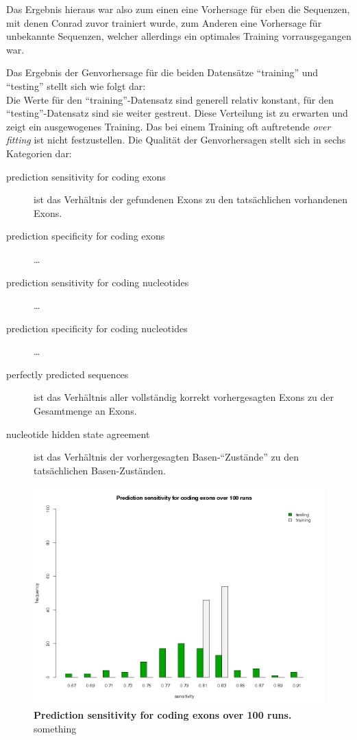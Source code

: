 Das Ergebnis hieraus war also zum einen eine Vorhersage für eben die Sequenzen,
mit denen Conrad zuvor trainiert wurde, zum Anderen eine Vorhersage für unbekannte
Sequenzen, welcher allerdings ein optimales Training vorrausgegangen war.

Das Ergebnis der Genvorhersage für die beiden Datensätze \enquote{training} und
\enquote{testing} stellt sich wie folgt dar:\\
Die Werte für den \enquote{training}-Datensatz sind generell relativ konstant,
für den \enquote{testing}-Datensatz sind sie weiter gestreut.
Diese Verteilung ist zu erwarten und zeigt ein ausgewogenes Training.
Das bei einem Training oft auftretende \textit{over fitting} ist nicht
festzustellen.
Die Qualität der Genvorhersagen stellt sich in sechs Kategorien dar:
\begin{description}
\item[prediction sensitivity for coding exons] ist das Verhältnis
der gefundenen Exons zu den tatsächlichen vorhandenen Exons.
\item[prediction specificity for coding exons] \ldots
\item[prediction sensitivity for coding nucleotides] \ldots
\item[prediction specificity for coding nucleotides] \ldots
\item[perfectly predicted sequences] ist das Verhältnis aller
vollständig korrekt vorhergesagten Exons zu der Gesamtmenge an Exons.
\item[nucleotide hidden state agreement] ist das Verhältnis der vorhergesagten
Basen-\enquote{Zustände} zu den tatsächlichen Basen-Zuständen.
\end{description}

\begin{figure}[ht]
	\begin{center}
		\includegraphics[scale=0.42]{pics/codingExons_sens.png}
	\caption[Prediction sensitivity for coding exons over 100 runs]{
	\textbf{Prediction sensitivity for coding exons over 100 runs.}
	something}
	\end{center}
	\label{fig:codingExons_sens}
\end{figure}


